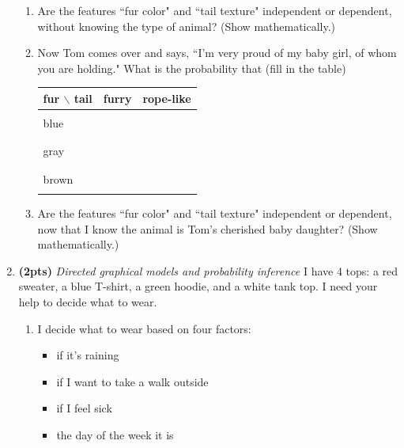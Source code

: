 \documentclass{article}
\newcommand{\blue}[1]{{\color{blue}#1}}
\newcommand{\gray}[1]{\textcolor{lightgray}{#1}}
\newcommand{\showpoints}[1]{\textbf{(#1)}}
\begin{document}
\begin{enumerate}
\begin{enumerate}
\item Are the features ``fur color" and ``tail texture" independent or dependent, without knowing the type of animal? (Show mathematically.)



\item Now Tom comes over and says, ``I'm very proud of my baby girl, of whom you are holding."
 What is the probability that  (fill in the table)
\begin{center}
\begin{tabular}{|l|ll|}
\hline
fur $\backslash$ tail & furry & rope-like\\\hline
&&\\blue&&\\&&\\
&&\\gray&&\\&&\\
&&\\brown&&\\&&\\
\hline
\end{tabular}
\end{center}



\item Are the features ``fur color" and ``tail texture" independent or dependent, now that I know the animal is Tom's cherished baby daughter? (Show mathematically.)


\end{enumerate}




\item \showpoints{2pts} \emph{Directed graphical models and probability inference} 
I have 4 tops: a red sweater, a blue T-shirt, a green hoodie, and a white tank top.
I need your help to decide what to wear.

\begin{enumerate}

\item I decide what to wear based on four factors:
\begin{itemize}
\item if it's raining
\item if I want to take a walk outside
\item if I feel sick
\item the day of the week it is
\end{itemize}



\end{enumerate}
\end{enumerate}
\end{document}
